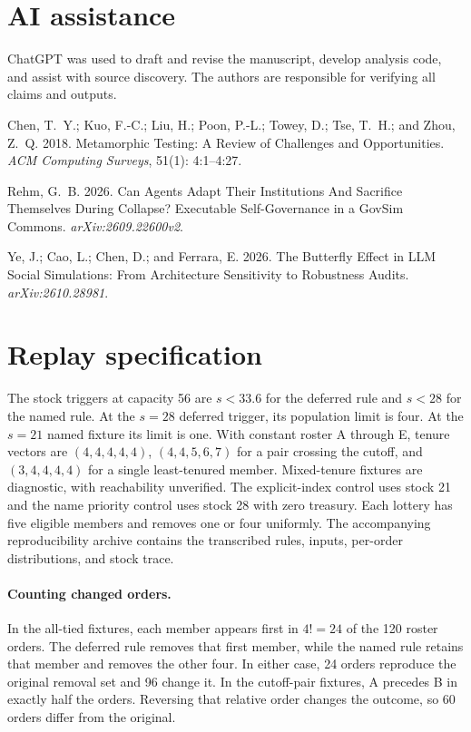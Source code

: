\documentclass[letterpaper]{article}
\begin{document}
\section{AI assistance}
ChatGPT was used to draft and revise the manuscript, develop analysis code, and assist with source discovery. The authors are responsible for verifying all claims and outputs.

\begin{thebibliography}{}
Chen, T.~Y.; Kuo, F.-C.; Liu, H.; Poon, P.-L.; Towey, D.; Tse, T.~H.; and Zhou, Z.~Q. 2018.
Metamorphic Testing: A Review of Challenges and Opportunities.
\textit{ACM Computing Surveys}, 51(1): 4:1--4:27.

Rehm, G.~B. 2026.
Can Agents Adapt Their Institutions And Sacrifice Themselves During Collapse? Executable Self-Governance in a GovSim Commons.
\textit{arXiv:2609.22600v2}.

Ye, J.; Cao, L.; Chen, D.; and Ferrara, E. 2026.
The Butterfly Effect in LLM Social Simulations: From Architecture Sensitivity to Robustness Audits.
\textit{arXiv:2610.28981}.
\end{thebibliography}

\appendix
\section{Replay specification}
The stock triggers at capacity 56 are $s<33.6$ for the deferred rule and $s<28$ for the named rule. At the $s=28$ deferred trigger, its population limit is four. At the $s=21$ named fixture its limit is one. With constant roster A through E, tenure vectors are $(4,4,4,4,4)$, $(4,4,5,6,7)$ for a pair crossing the cutoff, and $(3,4,4,4,4)$ for a single least-tenured member. Mixed-tenure fixtures are diagnostic, with reachability unverified. The explicit-index control uses stock 21 and the name priority control uses stock 28 with zero treasury. Each lottery has five eligible members and removes one or four uniformly. The accompanying reproducibility archive contains the transcribed rules, inputs, per-order distributions, and stock trace.

\paragraph{Counting changed orders.}
In the all-tied fixtures, each member appears first in $4!=24$ of the 120 roster orders. The deferred rule removes that first member, while the named rule retains that member and removes the other four. In either case, 24 orders reproduce the original removal set and 96 change it. In the cutoff-pair fixtures, A precedes B in exactly half the orders. Reversing that relative order changes the outcome, so 60 orders differ from the original.
\end{document}
